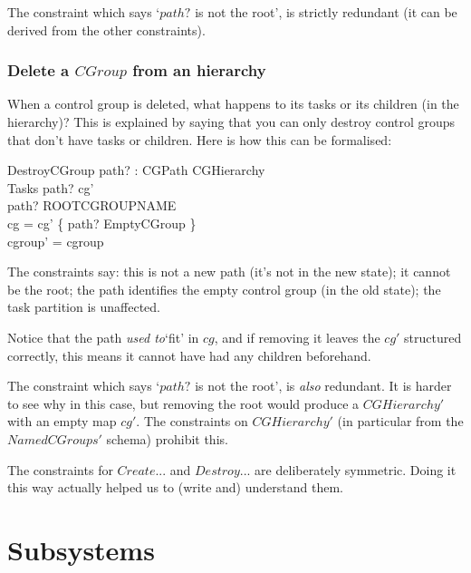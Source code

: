 \documentclass[a4paper,twoside,12pt]{article}
\begin{document}
The constraint which says `$path?$ is not the root', is strictly redundant (it can be derived from the other constraints).

\subsubsection{Delete a $CGroup$ from an hierarchy}

When a control group is deleted, what happens to its tasks or its children (in the hierarchy)?
This is explained by saying that you can only destroy control groups that don't have tasks or children.
Here is how this can be formalised:

\begin{schema}{DestroyCGroup}
path? : CGPath
\also
\Delta CGHierarchy \\
\Xi Tasks
\where
path? \notin \dom cg' \\
path? \neq ROOTCGROUPNAME \\
cg = cg' \cup \{ path? \mapsto EmptyCGroup \} \\
cgroup' = cgroup
\end{schema}
The constraints say: this is not a new path (it's not in the new state); it cannot be the root; the path identifies the empty control group (in the old state); the task partition is unaffected.

Notice that the path \emph{used to}`fit' in $cg$, and if removing it leaves the $cg'$ structured correctly, this means it cannot have had any children beforehand.

The constraint which says `$path?$ is not the root', is \emph{also} redundant. It is harder to see why in this case, but removing the root would produce a $CGHierarchy'$ with an empty map $cg'$. The constraints on $CGHierarchy'$ (in particular from the $NamedCGroups'$ schema) prohibit this.

The constraints for $Create$... and $Destroy$... are deliberately symmetric.
Doing it this way actually helped us to (write and) understand them.


\section{Subsystems}
\end{document}
